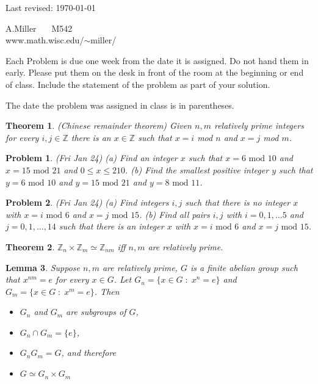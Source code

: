\documentclass[12pt]{article}
\def\zz{{\mathbb Z}}
\def\isom{\simeq}
\def\st{\;:\;}
\def\mod{\mbox{ mod }}
\newtheorem{theorem}{Theorem}
\newtheorem{lemma}[theorem]{Lemma}
\newtheorem{prob}{Problem}
\begin{document}
\noindent  Last revised: \today

\begin{flushright}
  A.Miller $\;\;\;\;$  M542 \\
  www.math.wisc.edu/$\sim$miller/\\
\end{flushright}


\bigskip
Each Problem is due one week from the date it is assigned.
Do not hand them in early.
Please put them on the desk in front of the room at the
beginning or end of class. Include the statement of the problem
as part of your solution.

The date the problem was assigned in class is in parentheses.

\bigskip


\begin{theorem}
(Chinese remainder theorem) Given $n,m$ relatively prime integers for
every $i,j\in\zz$ there is an $x\in\zz$ such that
$x=i$ mod  $n$ and $x=j$ mod  $m$.
\end{theorem}



\begin{prob} (Fri Jan 24) (a) Find an integer $x$ such that
$x= 6 \mod 10$ and $x=15 \mod 21$ and $0\leq x\leq 210$.
(b) Find the smallest positive integer $y$ such that 
$y= 6 \mod 10$ and $y=15 \mod 21$ and $y= 8 \mod 11$.
\end{prob}

\begin{prob}(Fri Jan 24)
(a) Find integers $i,j$ such that there is no integer $x$ with
$x= i \mod 6$ and $x= j \mod 15$.   (b) Find all pairs $i,j$
with $i=0,1,\dots 5$ and $j=0,1,\ldots, 14$ such that there
is an integer $x$ with $x= i \mod 6$ and $x= j \mod 15$.
\end{prob}


\begin{theorem}
$\zz_n\times\zz_m\isom \zz_{nm}$ iff $n,m$ are relatively prime.
\end{theorem}

\begin{lemma}
Suppose $n,m$ are relatively prime, $G$ is a finite abelian group such that
$x^{nm}=e$ for every $x\in G$.  Let $G_n=\{x\in G\st x^n=e\}$ and
$G_m=\{x\in G\st x^m=e\}$.  Then
\begin{itemize}
\item $G_n$ and $G_m$ are subgroups of $G$,
\item $G_n\cap G_m=\{e\}$,
\item $G_nG_m=G$, and therefore
\item $G\isom G_n\times G_m$
\end{itemize}
\end{lemma}
\end{document}
